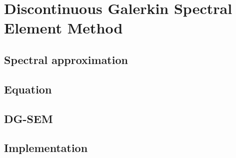 \chapter{Discontinuous Galerkin Spectral Element Method} \label{chapter:spectral_element_method} 

\section{Spectral approximation} \label{section:spectral_element_method:spectral_approximation}

\section{Equation} \label{section:spectral_element_method:equation}

\section{DG-SEM} \label{section:spectral_element_method:dg_sem}

\section{Implementation} \label{section:spectral_element_method:implementation}
